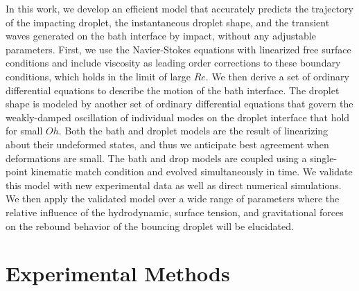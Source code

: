 \documentclass{jfm}
\begin{document}
\hspace*{1em} In this work, we develop an efficient model that accurately predicts the trajectory of the impacting droplet, the instantaneous droplet shape, and the transient waves generated on the bath interface by impact, without any adjustable parameters. First, we use the Navier-Stokes equations with linearized free surface conditions and include viscosity as leading order corrections to these boundary conditions, which holds in the limit of large $Re$.  We then derive a set of ordinary differential equations to describe the motion of the bath interface. The droplet shape is modeled by another set of ordinary differential equations that govern the weakly-damped oscillation of individual modes on the droplet interface that hold for small $Oh$.  Both the bath and droplet models are the result of linearizing about their undeformed states, and thus we anticipate best agreement when deformations are small.  The bath and drop models are coupled using a single-point kinematic match condition and evolved simultaneously in time.  We validate this model with new experimental data as well as direct numerical simulations.  We then apply the validated model over a wide range of parameters where the relative influence of the hydrodynamic, surface tension, and gravitational forces on the rebound behavior of the bouncing droplet will be elucidated.
\section{Experimental Methods}\label{sec.ExperimentalSetUP}
\end{document}
